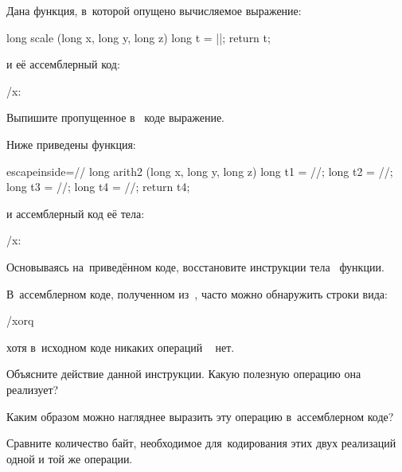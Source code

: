 \ExercisesSection
\begin{exercise}
\item Дана функция, в~которой опущено вычисляемое выражение:

\begin{ccode}
long scale (long x, long y, long z)
{
  long t = ||;
  return t;
}
\end{ccode}

и её ассемблерный код:

\precomment/x: %
\vspace{-0.6\baselineskip}

Выпишите пропущенное в~ коде выражение.


\item Ниже приведены  функция:

{\newcommand*{\ans}[1]{\ansfw{1.6cm}{#1}}
\begin{ccode*}{escapeinside=//}
long arith2 (long x, long y, long z)
{
  long t1 = /\ans{x | y}/;
  long t2 = /\ans{t1 >> 3}/;
  long t3 = /\ans{\textasciitilde{}t2}/;
  long t4 = /\ans{z \textendash{} t3}/;
  return t4;
}
\end{ccode*}
}
и ассемблерный код её тела:\enlargethispage{1\baselineskip}

\precomment/x: %
\vspace{-0.6\baselineskip}

Основываясь на~приведённом коде, восстановите инструкции тела~ функции.


\item В~ассемблерном коде, полученном из~, часто можно обнаружить строки вида:

\gas/xorq  %

хотя в~исходном коде никаких операций ~ нет.

\begin{enumIssue}
\item Объясните действие данной инструкции. Какую полезную операцию она реализует?

\item Каким образом можно нагляднее выразить эту операцию в~ассемблерном коде?

\item Сравните количество байт, необходимое для~кодирования этих двух реализаций одной и той же операции.
\end{enumIssue}



\end{exercise}
